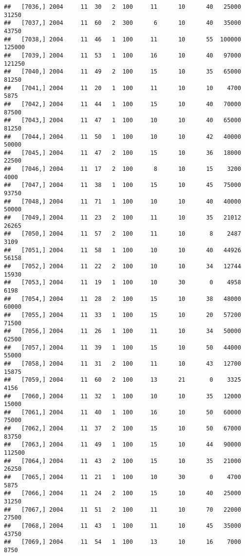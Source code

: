 \documentclass{article}\usepackage[]{graphicx}\usepackage[]{color}
\makeatletter
\newenvironment{kframe}{%
 \def\at@end@of@kframe{}%
 \ifinner\ifhmode%
  \def\at@end@of@kframe{\end{minipage}}%
  \begin{minipage}{\columnwidth}%
 \fi\fi%
 \def\FrameCommand##1{\hskip\@totalleftmargin \hskip-\fboxsep
 \colorbox{shadecolor}{##1}\hskip-\fboxsep
     \hskip-\linewidth \hskip-\@totalleftmargin \hskip\columnwidth}%
 \MakeFramed {\advance\hsize-\width
   \@totalleftmargin\z@ \linewidth\hsize
   \@setminipage}}%
 {\par\unskip\endMakeFramed%
 \at@end@of@kframe}
\newenvironment{knitrout}{}{} %
\makeatother
\begin{document}
\begin{knitrout}
\begin{kframe}
\begin{verbatim}
##   [7036,] 2004     11  30   2  100     11      10      40   25000   31250
##   [7037,] 2004     11  60   2  300      6      10      40   35000   43750
##   [7038,] 2004     11  46   1  100     11      10      55  100000  125000
##   [7039,] 2004     11  53   1  100     16      10      40   97000  121250
##   [7040,] 2004     11  49   2  100     15      10      35   65000   81250
##   [7041,] 2004     11  20   1  100     11      10      10    4700    5875
##   [7042,] 2004     11  44   1  100     15      10      40   70000   87500
##   [7043,] 2004     11  47   1  100     10      10      40   65000   81250
##   [7044,] 2004     11  50   1  100     10      10      42   40000   50000
##   [7045,] 2004     11  47   2  100     15      10      36   18000   22500
##   [7046,] 2004     11  17   2  100      8      10      15    3200    4000
##   [7047,] 2004     11  38   1  100     15      10      45   75000   93750
##   [7048,] 2004     11  71   1  100     10      10      40   40000   50000
##   [7049,] 2004     11  23   2  100     11      10      35   21012   26265
##   [7050,] 2004     11  57   2  100     11      10       8    2487    3109
##   [7051,] 2004     11  58   1  100     10      10      40   44926   56158
##   [7052,] 2004     11  22   2  100     10      10      34   12744   15930
##   [7053,] 2004     11  19   1  100     10      30       0    4958    6198
##   [7054,] 2004     11  28   2  100     15      10      38   48000   60000
##   [7055,] 2004     11  33   1  100     15      10      20   57200   71500
##   [7056,] 2004     11  26   1  100     11      10      34   50000   62500
##   [7057,] 2004     11  39   1  100     15      10      50   44000   55000
##   [7058,] 2004     11  31   2  100     11      10      43   12700   15875
##   [7059,] 2004     11  60   2  100     13      21       0    3325    4156
##   [7060,] 2004     11  32   1  100     10      10      35   12000   15000
##   [7061,] 2004     11  40   1  100     16      10      50   60000   75000
##   [7062,] 2004     11  37   2  100     15      10      50   67000   83750
##   [7063,] 2004     11  49   1  100     15      10      44   90000  112500
##   [7064,] 2004     11  43   2  100     15      10      35   21000   26250
##   [7065,] 2004     11  21   1  100     10      30       0    4700    5875
##   [7066,] 2004     11  24   2  100     15      10      40   25000   31250
##   [7067,] 2004     11  51   2  100     11      10      70   22000   27500
##   [7068,] 2004     11  43   1  100     11      10      45   35000   43750
##   [7069,] 2004     11  54   1  100     13      10      16    7000    8750

\end{verbatim}
\end{kframe}
\end{knitrout}
\end{document}
